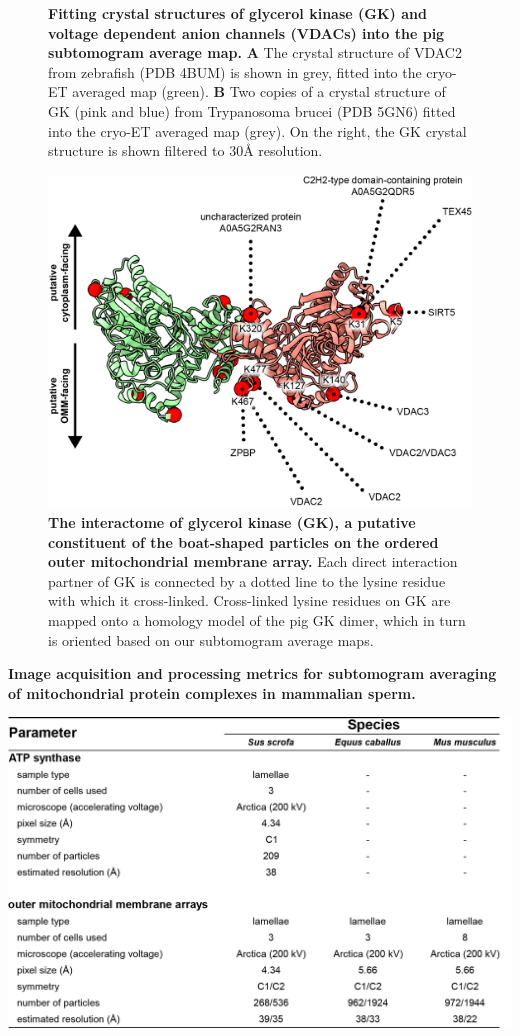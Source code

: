 \begin{subappendices}
\begin{figure}[hbt]
		\caption{\textbf{Fitting crystal structures of glycerol kinase (GK) and voltage dependent anion channels (VDACs) into the pig subtomogram average map.} \textbf{A} The crystal structure of VDAC2 from zebrafish (PDB 4BUM) is shown in grey, fitted into the cryo-ET averaged map (green). \textbf{B} Two copies of a crystal structure of GK (pink and blue) from Trypanosoma brucei (PDB 5GN6) fitted into the cryo-ET averaged map (grey). On the right, the GK crystal structure is shown filtered to 30Å resolution.}
		\label{fig:ch4_app_fig5}
	\end{figure}
	\begin{figure}[hbt]
		\center
		\includegraphics[]{Chapter.4/Figures/SI_Figure6.png}
		\caption{\textbf{The interactome of glycerol kinase (GK), a putative constituent of the boat-shaped particles on the ordered outer mitochondrial membrane array.} Each direct interaction partner of GK is connected by a dotted line to the lysine residue with which it cross-linked. Cross-linked lysine residues on GK are mapped onto a homology model of the pig GK dimer, which in turn is oriented based on our subtomogram average maps.}
		\label{fig:ch4_app_fig6}
	\end{figure}
	\begin{table}[hbt!]
		\caption{\textbf{Image acquisition and processing metrics for subtomogram averaging of mitochondrial protein complexes in mammalian
				sperm.}}
		\includegraphics[]{Chapter.4/Figures/SI_Table1.png}

\end{table}
\end{subappendices}

